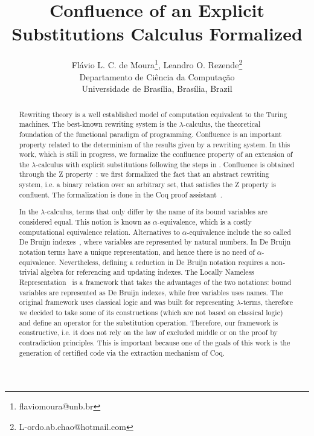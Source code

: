 \documentclass[11pt]{article}
\date{}
\begin{document}
\title{Confluence of an Explicit Substitutions Calculus Formalized}

\author{
  {\large Fl\'avio L. C. de Moura}\thanks{flaviomoura@unb.br},
    {\large Leandro O. Rezende}\thanks{L-ordo.ab.chao@hotmail.com}\\
  {\small Departamento de Ci\^encia da Computa\c{c}\~ao}\\
  {\small Universidade de Bras\'ilia, Bras\'ilia, Brazil} }

\maketitle

\begin{abstract}
  Rewriting theory is a well established model of computation
  equivalent to the Turing machines. The best-known rewriting
  system is the $\lambda$-calculus, the theoretical foundation of the
  functional paradigm of programming. Confluence is an important
  property related to the determinism of the results given by a
  rewriting system. In this work, which is still in progress, we
  formalize the confluence property of an extension of the
  $\lambda$-calculus with explicit substitutions following the steps
  in \cite{DK08,kes09}. Confluence is obtained through the Z
  property~\cite{zproperty}: we first formalized the fact that an
  abstract rewriting system, i.e. a binary relation over an arbitrary
  set, that satisfies the Z property is confluent. The formalization
  is done in the Coq proof assistant~\cite{CoqTeam}.

  In the $\lambda$-calculus, terms that only differ by the name of its
  bound variables are considered equal. This notion is known as
  $\alpha$-equivalence, which is a costly computational equivalence
  relation. Alternatives to $\alpha$-equivalence include the so called
  De Bruijn indexes~\cite{dB72}, where variables are represented by
  natural numbers. In De Bruijn notation terms have a unique
  representation, and hence there is no need of
  $\alpha$-equivalence. Nevertheless, defining a reduction in De
  Bruijn notation requires a non-trivial algebra for referencing and
  updating indexes. The Locally Nameless Representation~\cite{Ch11} is
  a framework that takes the advantages of the two notations: bound
  variables are represented as De Bruijn indexes, while free variables
  uses names. The original framework uses classical logic and was
  built for representing $\lambda$-terms, therefore we decided to take
  some of its constructions (which are not based on classical logic)
  and define an operator for the substitution operation. Therefore,
  our framework is constructive, i.e. it does not rely on the law of
  excluded middle or on the proof by contradiction principles. This is
  important because one of the goals of this work is the generation of
  certified code via the extraction mechanism of Coq.


\end{abstract}
\end{document}
